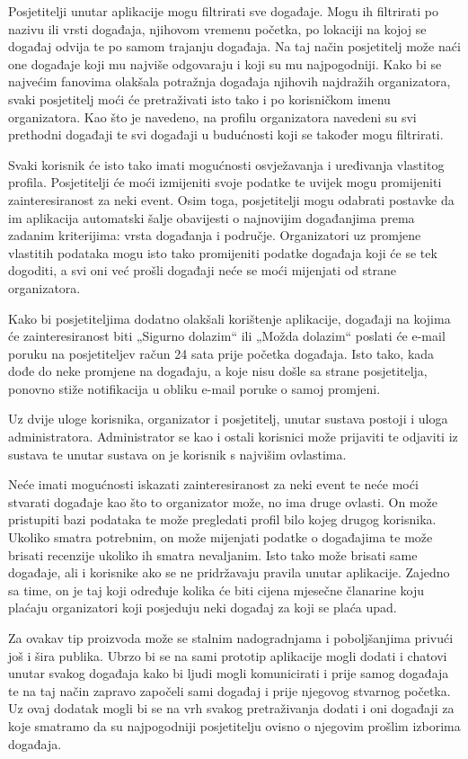 		Posjetitelji unutar aplikacije mogu filtrirati sve događaje. Mogu ih filtrirati po nazivu ili vrsti događaja, njihovom vremenu početka, po lokaciji na kojoj se događaj odvija te po samom trajanju događaja. Na taj način posjetitelj može naći one događaje koji mu najviše odgovaraju i koji su mu najpogodniji. Kako bi se najvećim fanovima olakšala potražnja događaja njihovih najdražih organizatora, svaki posjetitelj moći će pretraživati isto tako i po korisničkom imenu organizatora. Kao što je navedeno, na profilu organizatora navedeni su svi prethodni događaji te svi događaji u budućnosti koji se također mogu filtrirati.
		
		Svaki korisnik će isto tako imati mogućnosti osvježavanja i uređivanja vlastitog profila. Posjetitelji će moći izmijeniti svoje podatke te uvijek mogu promijeniti zainteresiranost za neki event. Osim toga, posjetitelji mogu odabrati postavke da im aplikacija automatski šalje obavijesti o najnovijim događanjima prema zadanim kriterijima: vrsta događanja i područje. Organizatori uz promjene vlastitih podataka mogu isto tako promijeniti podatke događaja koji će se tek dogoditi, a svi oni već prošli događaji neće se moći mijenjati od strane organizatora. 
		
		Kako bi posjetiteljima dodatno olakšali korištenje aplikacije, događaji na kojima će zainteresiranost biti „Sigurno dolazim“ ili „Možda dolazim“ poslati će e-mail poruku na posjetiteljev račun 24 sata prije početka događaja. Isto tako, kada dođe do neke promjene na događaju, a koje nisu došle sa strane posjetitelja, ponovno stiže notifikacija u obliku e-mail poruke o samoj promjeni.
		
		Uz dvije uloge korisnika, organizator i posjetitelj, unutar sustava postoji i uloga administratora. Administrator se kao i ostali korisnici može prijaviti te odjaviti iz sustava te unutar sustava on je korisnik s najvišim ovlastima. 
		
		Neće imati mogućnosti iskazati zainteresiranost za neki event te neće moći stvarati događaje kao što to organizator može, no ima druge ovlasti. On može pristupiti bazi podataka te može pregledati profil bilo kojeg drugog korisnika. Ukoliko smatra potrebnim, on može mijenjati podatke o događajima te može brisati recenzije ukoliko ih smatra nevaljanim. Isto tako može brisati same događaje, ali i korisnike ako se ne pridržavaju pravila unutar aplikacije. Zajedno sa time, on je taj koji određuje kolika će biti cijena mjesečne članarine koju plaćaju organizatori koji posjeduju neki događaj za koji se plaća upad.
		
		Za ovakav tip proizvoda može se stalnim nadogradnjama i poboljšanjima privući još i šira publika. Ubrzo bi se na sami prototip aplikacije mogli dodati i chatovi unutar svakog događaja kako bi ljudi mogli komunicirati i prije samog događaja te na taj način zapravo započeli sami događaj i prije njegovog stvarnog početka. Uz ovaj dodatak mogli bi se na vrh svakog pretraživanja dodati i oni događaji za koje smatramo da su najpogodniji posjetitelju ovisno o njegovim prošlim izborima događaja. 
		
		\eject

		
